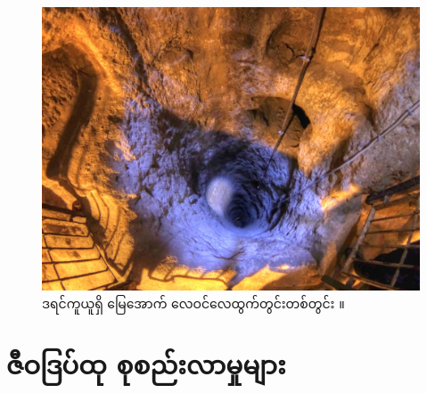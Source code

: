 \documentclass[10pt,twocolumn,letterpaper]{article}
\begin{document}
\begin{figure}[t]
\begin{center}
   \includegraphics[width=1\linewidth]{derinkuyu-air.jpg}
\end{center}
   \caption{ဒရင်ကူယူရှိ မြေအောက် လေဝင်လေထွက်တွင်းတစ်တွင်း \cite{53}။}
\label{fig:6}
\label{fig:onecol}
\end{figure}



\section{ဇီဝဒြပ်ထု စုစည်းလာမှုများ}
\end{document}

